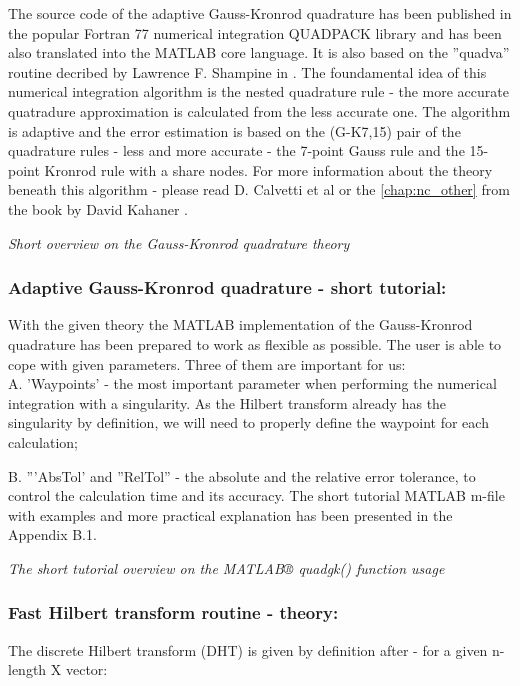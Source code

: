\documentclass[12pt,twoside,a4paper]{article}
\numberwithin{equation}{subsection}
\numberwithin{figure}{subsection}
\begin{document}
The source code of the adaptive Gauss-Kronrod quadrature has been published in the popular Fortran 77 numerical integration
QUADPACK library and has been also translated into the MATLAB core language. It is also based on the ''quadva'' routine decribed by
Lawrence F. Shampine in \cite{shampine_vectorized}. The foundamental idea of this numerical integration algorithm is the nested
quadrature rule - the more accurate quatradure approximation is calculated from the less accurate one. The algorithm is adaptive
and the error estimation is based on the (G-K7,15) pair of the quadrature rules - less and more accurate - the 7-point Gauss rule
and the 15-point Kronrod rule with a share nodes. For more information about the theory beneath this algorithm - please read D.
Calvetti et al \cite{calvetti_computation} or the \ref{chap:nc_other} from the book by David Kahaner \cite{kahaner_numerical}.

\textit{Short overview on the Gauss-Kronrod quadrature theory}

\subsubsection*{Adaptive Gauss-Kronrod quadrature - short tutorial:}

With the given theory the MATLAB implementation of the Gauss-Kronrod quadrature has been prepared to work as flexible as possible.
The user is able to cope with given parameters. Three of them are important for us: \\
A. 'Waypoints' - the most important parameter when performing the numerical integration with a singularity. As the Hilbert
transform already has the singularity by definition, we will need to properly define the waypoint for each calculation;

B. '''AbsTol' and ''RelTol'' - the absolute and the relative error tolerance, to control the calculation time and its accuracy. The
short tutorial MATLAB m-file with examples and more practical explanation has been presented in the Appendix B.1.

\textit{The short tutorial overview on the MATLAB® quadgk() function usage}

\subsubsection*{Fast Hilbert transform routine - theory:}

The discrete Hilbert transform (DHT) is given by definition after \cite{kak_multilayeredarray} - for a given n-length X vector:
\end{document}
